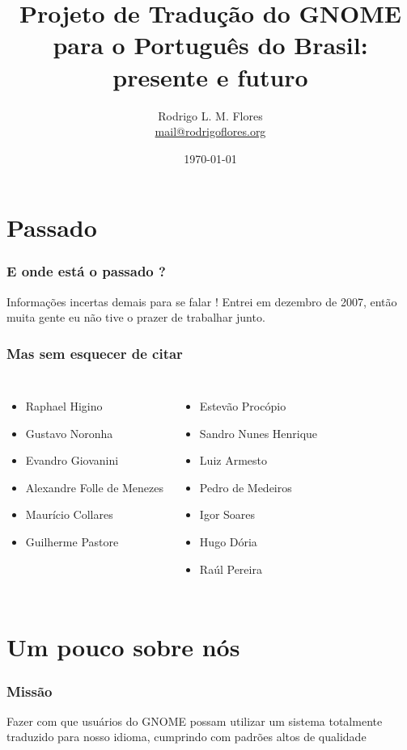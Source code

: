 \documentclass{beamer}
\title{Projeto de Tradução do GNOME para o Português do Brasil: presente e futuro}
\author{Rodrigo L. M. Flores \\ \url{mail@rodrigoflores.org}}
\institute{GNOME Brasil}
\begin{document}
\date{\today}

\frame{\titlepage}

\frame{\tableofcontents}

\section{Passado}

\begin{frame}
    \frametitle{E onde está o passado ?}
    Informações incertas demais para se falar ! Entrei em dezembro de 2007, então muita gente eu não tive
    o prazer de trabalhar junto. 
\end{frame}

\begin{frame}
    \frametitle{Mas sem esquecer de citar}
    \begin{columns}[c]
      \column{1.5in}
        \begin{itemize}
          \item Raphael Higino
          \item Gustavo Noronha
          \item Evandro Giovanini
          \item Alexandre Folle de Menezes
          \item Maurício Collares
          \item Guilherme Pastore
        \end{itemize}
       \column{1.5in}
        \begin{itemize}
          \item Estevão Procópio
          \item Sandro Nunes Henrique 
          \item Luiz Armesto
          \item Pedro de Medeiros
          \item Igor Soares
          \item Hugo Dória
          \item Raúl Pereira
        \end{itemize}
    \end{columns}
\end{frame}

\section{Um pouco sobre nós}

\begin{frame}
    \frametitle{Missão}
    Fazer com que usuários do GNOME possam utilizar um sistema 
    totalmente traduzido para nosso idioma, cumprindo 
    com padrões altos de qualidade 
\end{frame}
\end{document}

